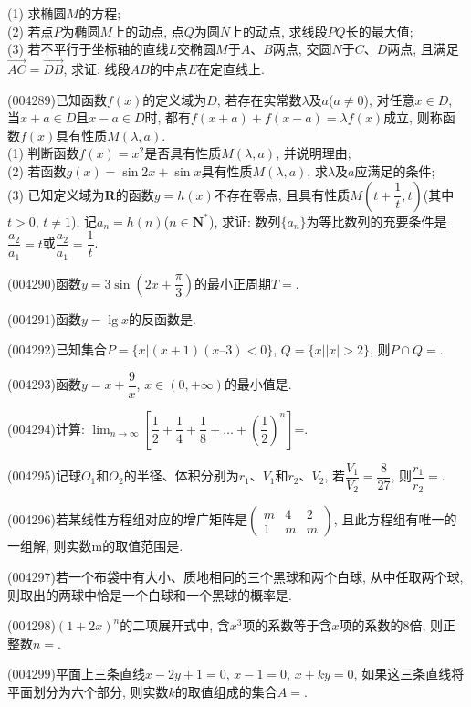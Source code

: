 (1) 求椭圆$M$的方程;\\
(2) 若点$P$为椭圆$M$上的动点, 点$Q$为圆$N$上的动点, 求线段$PQ$长的最大值;\\
(3) 若不平行于坐标轴的直线$L$交椭圆$M$于$A$、$B$两点, 交圆$N$于$C$、$D$两点, 且满足$\overrightarrow{AC}=\overrightarrow{DB}$, 求证: 线段$AB$的中点$E$在定直线上.
\item (004289)已知函数$f(x)$的定义域为$D$, 若存在实常数$\lambda$及$a$($a\ne 0$), 对任意$x\in D$, 当$x+a\in D$且$x-a\in D$时, 都有$f(x+a)+f(x-a)=\lambda f(x)$成立, 则称函数$f(x)$具有性质$M(\lambda,a)$.\\
(1) 判断函数$f(x)=x^2$是否具有性质$M(\lambda,a)$, 并说明理由;\\
(2) 若函数$g(x)=\sin 2x+\sin x$具有性质$M(\lambda,a)$, 求$\lambda$及$a$应满足的条件;\\
(3) 已知定义域为$\mathbf{R}$的函数$y=h(x)$不存在零点, 且具有性质$M(t+\dfrac{1}{t},t)$(其中$t>0$, $t\ne 1$), 记$a_n=h(n)$($n\in \mathbf{N}^*$), 求证: 数列$\{a_n\}$为等比数列的充要条件是$\dfrac{a_2}{a_1}=t$或$\dfrac{a_2}{a_1}=\dfrac{1}{t}$.
\item (004290)函数$y=3\sin(2x+\dfrac{\pi}3)$的最小正周期$T=$.
\item (004291)函数$y=\lg x$的反函数是.
\item (004292)已知集合$P=\{x|(x+1)(x–3)<0\}$, $Q=\{x||x|>2\}$, 则$P\cap Q=$.
\item (004293)函数$y=x+\dfrac 9x$, $x\in (0,+\infty)$的最小值是.
\item (004294)计算: $\displaystyle\lim_{n\to \infty}[\dfrac 12+\dfrac 14+\dfrac 18+\ldots +(\dfrac 12)^n]$=.
\item (004295)记球$O_1$和$O_2$的半径、体积分别为$r_1$、$V_1$和$r_2$、$V_2$, 若$\dfrac{V_1}{V_2}=\dfrac 8{27}$, 则$\dfrac{r_1}{r_2}=$.
\item (004296)若某线性方程组对应的增广矩阵是$\begin{pmatrix}   m & 4 & 2  \\1 & m & m  \end{pmatrix}$, 且此方程组有唯一的一组解, 则实数m的取值范围是.
\item (004297)若一个布袋中有大小、质地相同的三个黑球和两个白球, 从中任取两个球, 则取出的两球中恰是一个白球和一个黑球的概率是.
\item (004298)$(1+2x)^n$的二项展开式中, 含$x^3$项的系数等于含$x$项的系数的$8$倍, 则正整数$n=$.
\item (004299)平面上三条直线$x-2y+1=0$, $x-1=0$, $x+ky=0$, 如果这三条直线将平面划分为六个部分, 则实数$k$的取值组成的集合$A=$.
